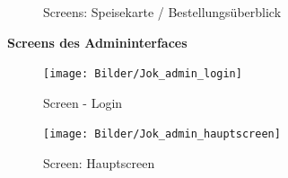 			\begin{figure}[H]
			\begin{centering}
			\par\end{centering}
			\caption{Screens: Speisekarte / Bestellungsüberblick}
			\label{Screens: Speisekarte / Bestellungsüberblick}
			\end{figure}
\textbf{Screens des Admininterfaces}
			\begin{figure}[H]
			\begin{centering}
			\texttt{[image: Bilder/Jok\_admin\_login]}
			\par\end{centering}
			\caption{Screen - Login}
			\label{Screen - Login}
			\end{figure}
			\begin{figure}[H]
			\begin{centering}
			\texttt{[image: Bilder/Jok\_admin\_hauptscreen]}
			\par\end{centering}
			\caption{Screen: Hauptscreen}
			\label{Screen: Hauptscreen}
			\end{figure}  

